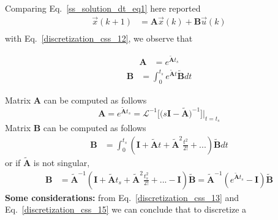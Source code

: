 \documentclass[11pt,a4paper,oneside]{book}
\numberwithin{equation}{section}
\theoremstyle{it}
\theoremstyle{definition}
\begin{document}
Comparing Eq.~\eqref{ss_solution_dt_eq1} here reported
\begin{equation}\label{}
	\begin{aligned}
		\vec{x}(k+1) &= \mathbf{A}\vec{x}(k) + \mathbf{B}\vec{u}(k) \\[6pt]
	\end{aligned}
\end{equation}
with 
Eq.~\eqref{discretization_css_12}, we observe that
\begin{mybox}
	\begin{equation}\label{discretization_css_13}
		\begin{aligned}
			\mathbf{A} &= e^{\tilde{\mathbf{A}}t_s}
		\end{aligned}
	\end{equation}
	\begin{equation}\label{eq67b}
		\begin{aligned}
			\mathbf{B} &= \int_{0}^{t_s}e^{\tilde{\mathbf{A}}t} \tilde{\mathbf{B}}dt
		\end{aligned}
	\end{equation}
\end{mybox}
Matrix $\mathbf{A}$ can be computed as follows
\begin{equation}
	\mathbf{A} = e^{\tilde{\mathbf{A}}t_s} = 
	\mathcal{L}^{-1}\Big[\Big(s\mathbf{I}- 
	\tilde{\mathbf{A}}\Big)^{-1}\Big]\Bigg|_{t=t_s}
\end{equation}
Matrix $\mathbf{B}$ can be computed as follows
\begin{equation}\label{discretization_css_14}
	\begin{aligned}
		\mathbf{B} &= \int_{0}^{t_s}\left(\mathbf{I}+\tilde{\mathbf{A}}t+\tilde{\mathbf{A}}^2\frac{t^2}{2!}+...\right) \tilde{\mathbf{B}} dt
	\end{aligned}
\end{equation}
or if ${\tilde{\mathbf{A}}}$ is not singular,
\begin{equation}\label{discretization_css_15}
	\begin{aligned}
		\mathbf{B} &= \tilde{\mathbf{A}}^{-1}\left(\mathbf{I}+\tilde{\mathbf{A}}t_s+\tilde{\mathbf{A}}^2\frac{t_s^2}{2!}+...-\mathbf{I}\right) \tilde{\mathbf{B}} = \tilde{\mathbf{A}}^{-1}\left( e^{\tilde{\mathbf{A}}t_s} -\mathbf{I}\right) \tilde{\mathbf{B}}
	\end{aligned}
\end{equation}
\noindent\textbf{Some considerations:} from Eq.~\eqref{discretization_css_13} 
and Eq.~\eqref{discretization_css_15} we can conclude that to discretize a 
\end{document}
